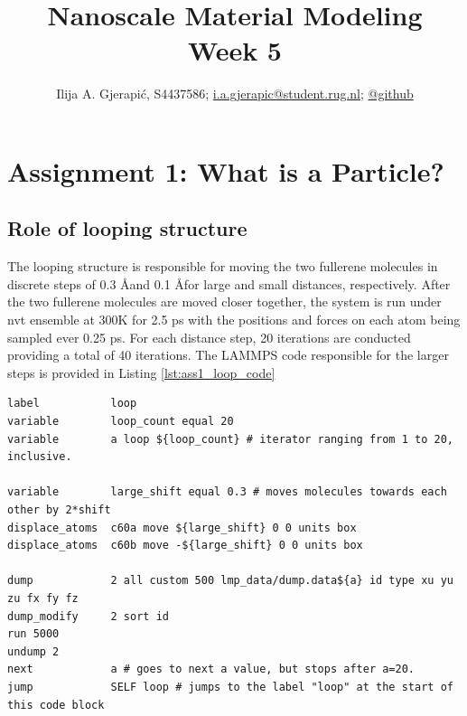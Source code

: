 \documentclass[10pt,a4paper]{labreport}
\title{Nanoscale Material Modeling
\\
\normalsize{Week 5}} %
\author{Ilija A. Gjerapić, S4437586; \href{mailto:i.a.gjerapic@student.rug.nl}{i.a.gjerapic@student.rug.nl}; \href{https://github.com/igjerapic/nmm-week5/}{@github} } %
\begin{document}
\maketitle
\tableofcontents



  

\thispagestyle{firststyle}
\newpage
\section{Assignment 1: What is a Particle?}

\subsection{Role of looping structure}
The looping structure is responsible for moving the two fullerene molecules in discrete steps of 0.3 \AA and 0.1 \AA for large and small distances, respectively. After the two fullerene molecules are moved closer together, the system is run under nvt ensemble at 300K for 2.5 ps with the positions and forces on each atom being sampled ever 0.25 ps. For each distance step, 20 iterations are conducted providing a total of 40 iterations. The LAMMPS code responsible for the larger steps is provided in Listing \ref{lst:ass1_loop_code}
\begin{lstlisting}[caption={The LAMMPS code for moving the two fullerne molecules closer together for larger distances in discrete steps of 0.3 \AA over 20 iterations. After the inital movement of atom posisitions, the system is run under nvt ensemble at 300K for 2.5 ps with the positions and force on each atom being sampled ever 0.25 ps. },
  label=lst:ass1_loop_code]
label           loop
variable        loop_count equal 20 
variable        a loop ${loop_count} # iterator ranging from 1 to 20, inclusive. 

variable        large_shift equal 0.3 # moves molecules towards each other by 2*shift
displace_atoms  c60a move ${large_shift} 0 0 units box 
displace_atoms  c60b move -${large_shift} 0 0 units box 

dump            2 all custom 500 lmp_data/dump.data${a} id type xu yu zu fx fy fz
dump_modify     2 sort id
run 5000
undump 2
next            a # goes to next a value, but stops after a=20. 
jump            SELF loop # jumps to the label "loop" at the start of this code block
\end{lstlisting}
\end{document}
